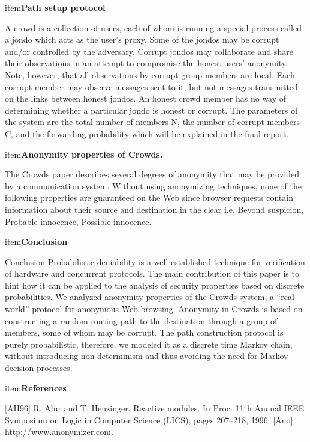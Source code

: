 \documentclass[10pt]{article}
\begin{document}
\begin{enumerate}
{{{}
\begin{enumarate}
item\textbf{{\large Path setup protocol }}
\end{enumarate}
{\raggedright
{\large  A crowd is a collection of users, each of whom is running a special process called a jondo which acts as the user’s proxy. Some of the jondos may be corrupt and/or controlled by the adversary. Corrupt jondos may collaborate and share their observations in an attempt to compromise the honest users’ anonymity. Note, however, that all observations by corrupt group members are local. Each corrupt member may observe messages sent to it, but not messages transmitted on the links between honest jondos. An honest crowd member has no way of determining whether a particular jondo is honest or corrupt. The parameters of the system are the total number of members N, the number of corrupt members C, and the forwarding probability which will be explained in the final report. 
}}

\begin{enumarate}
item\textbf{{\large Anonymity properties of Crowds.
 }}
\end{enumarate}
{\raggedright
{\large  The Crowds paper describes several degrees of anonymity that may be provided by a communication system. Without using anonymizing techniques, none of the following properties are guaranteed on the Web since browser requests contain information about their source and destination in the clear i.e. Beyond suspicion, Probable innocence, Possible innocence.
}
\begin{enumerate}
	item\textbf{{\large Conclusion}}
\end {enumerate}
{\raggedright
	
}
{\large Conclusion
Probabilistic deniability is a well-established technique for verification of hardware and concurrent protocols. The main contribution of this paper is to hint how it can be applied to the analysis of security properties based on discrete probabilities. We analyzed anonymity properties of the Crowds system, a “real-world” protocol for anonymous Web browsing. Anonymity in Crowds is based on constructing a random routing path to the destination through a group of members, some of whom may be corrupt. The path construction protocol is purely probabilistic, therefore, we modeled it as a discrete time Markov chain, without introducing non-determinism and thus avoiding the need for Markov decision processes.
}
}
\begin{enumarate}
	item\textbf{{\large References}}
	{\raggedright
	{\large [AH96] R. Alur and T. Henzinger. Reactive modules. In Proc. 11th Annual
IEEE Symposium on Logic in Computer Science (LICS), pages 207–218, 1996.
[Ano] http://www.anonymizer.com.

}}
\end{enumarate}}}
\end{enumerate}
\end{document}
